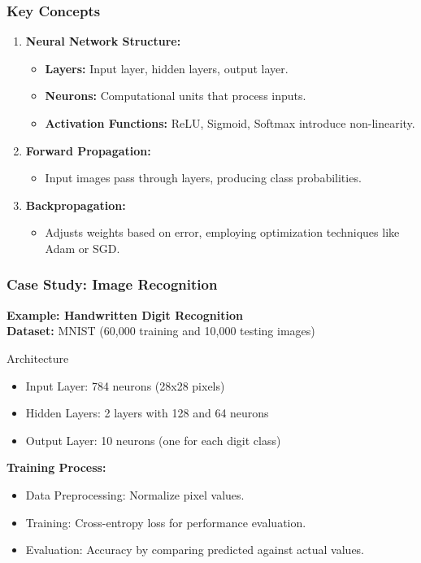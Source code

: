 \documentclass{beamer}
\begin{document}
\begin{frame}[fragile]
    \frametitle{Key Concepts}
    \begin{enumerate}
        \item \textbf{Neural Network Structure:}
        \begin{itemize}
            \item \textbf{Layers:} Input layer, hidden layers, output layer.
            \item \textbf{Neurons:} Computational units that process inputs.
            \item \textbf{Activation Functions:} ReLU, Sigmoid, Softmax introduce non-linearity.
        \end{itemize}
        
        \item \textbf{Forward Propagation:}
        \begin{itemize}
            \item Input images pass through layers, producing class probabilities.
        \end{itemize}

        \item \textbf{Backpropagation:}
        \begin{itemize}
            \item Adjusts weights based on error, employing optimization techniques like Adam or SGD.
        \end{itemize}
    \end{enumerate}
\end{frame}

\begin{frame}[fragile]
    \frametitle{Case Study: Image Recognition}
    \textbf{Example: Handwritten Digit Recognition} \\
    \textbf{Dataset:} MNIST (60,000 training and 10,000 testing images)

    \begin{block}{Architecture}
        \begin{itemize}
            \item Input Layer: 784 neurons (28x28 pixels)
            \item Hidden Layers: 2 layers with 128 and 64 neurons
            \item Output Layer: 10 neurons (one for each digit class)
        \end{itemize}
    \end{block}

    \textbf{Training Process:}
    \begin{itemize}
        \item Data Preprocessing: Normalize pixel values.
        \item Training: Cross-entropy loss for performance evaluation.
        \item Evaluation: Accuracy by comparing predicted against actual values.
    \end{itemize}
\end{frame}
\end{document}
